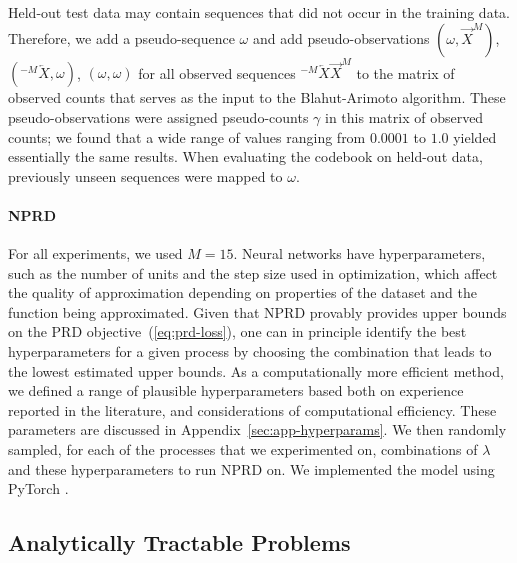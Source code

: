 \documentclass[entropy,article,submit,moreauthors,pdftex,10pt,a4paper]{Definitions/mdpi}
\newcommand{\finitefuture}{\overrightarrow{X}^{M}}
\newcommand{\finitepast}{^{-M}\overleftarrow{X}}%
\begin{document}
Held-out test data may contain sequences that did not occur in the training data. Therefore, we add a pseudo-sequence $\omega$ and add pseudo-observations $(\omega, \finitefuture)$, $(\finitepast, \omega)$, $(\omega, \omega)$ for all observed sequences $\finitepast\finitefuture$ to the matrix of observed counts that serves as the input to the Blahut-Arimoto algorithm.
These pseudo-observations were assigned pseudo-counts $\gamma$ in this matrix of observed counts; we found that a wide range of values ranging from $0.0001$ to $1.0$ yielded essentially the same results.
When evaluating the codebook on held-out data, previously unseen sequences were mapped to $\omega$.


\paragraph{NPRD}
For all experiments, we used $M=15$.
Neural networks have hyperparameters, such as the number of units and the step size used in optimization, which affect the quality of approximation depending on properties of the dataset and the function being approximated.
Given that NPRD provably provides upper bounds on the PRD objective~(\ref{eq:prd-loss}), one can in principle identify the best hyperparameters for a given process by choosing the combination that leads to the lowest estimated upper bounds.
As a computationally more efficient method, we defined a range of plausible hyperparameters based both on experience reported in the literature, and considerations of computational efficiency.
These parameters are discussed in Appendix~\ref{sec:app-hyperparams}.
We then randomly sampled, for each of the processes that we experimented on, combinations of $\lambda$ and these hyperparameters to run NPRD on.
We implemented the model using PyTorch \citep{paszke2017automatic}.

\subsection{Analytically Tractable Problems}\label{sec:tractable}
\end{document}
